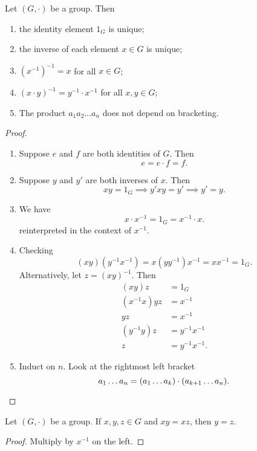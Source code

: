 \begin{proposition}
    Let $(G, \cdot)$ be a group. Then
    \begin{enumerate}
        \item the identity element $1_G$ is unique;
        \item the inverse of each element $x \in G$ is unique;
        \item $(x^{-1})^{-1} = x$ for all $x \in G$;
        \item $(x \cdot y)^{-1} = y^{-1} \cdot x^{-1}$ for all $x, y \in G$;
        \item The product $a_1 a_2 \dots a_n$ does not depend on bracketing.
    \end{enumerate}
\end{proposition}
\begin{proof} \leavevmode
    \begin{enumerate}
        \item Suppose $e$ and $f$ are both identities of $G$.
            Then \[
                e = e \cdot f = f.
            \]
        \item Suppose $y$ and $y'$ are both inverses of $x$.
            Then \[
                xy = 1_G \implies y'xy = y' \implies y' = y.
            \]
        \item We have \[
            x \cdot x^{-1} = 1_G = x^{-1} \cdot x.
        \] reinterpreted in the context of $x^{-1}$.
        \item Checking \[
            (xy)(y^{-1}x^{-1}) = x(y y^{-1})x^{-1} = xx^{-1} = 1_G.
        \] Alternatively, let $z = (xy)^{-1}$.
        Then \begin{align*}
            (xy)z &= 1_G \\
            (x^{-1}x)yz &= x^{-1} \\
            yz &= x^{-1} \\
            (y^{-1}y)z &= y^{-1}x^{-1} \\
            z &= y^{-1}x^{-1}.
        \end{align*}
        \item Induct on $n$.
        Look at the rightmost left bracket \[
            a_1 \dots a_n = (a_1 \dots a_k) \cdot (a_{k+1} \dots a_n).
                \qedhere
        \]
    \end{enumerate}
\end{proof}

\begin{corollary} \label{thm:group:cancel}
    Let $(G, \cdot)$ be a group.
    If $x, y, z \in G$ and $xy = xz$, then $y = z$.
\end{corollary}
\begin{proof}
    Multiply by $x^{-1}$ on the left.
\end{proof}
